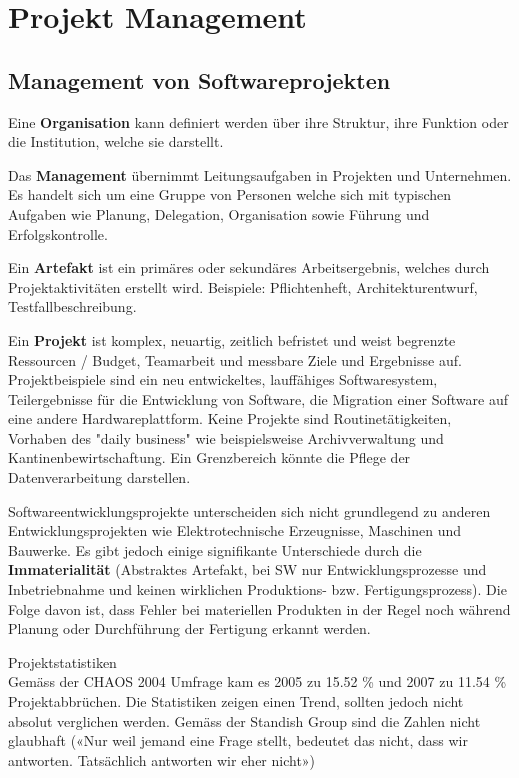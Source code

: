 \chapter{Projekt Management}

\section{Management von Softwareprojekten}

Eine \textbf{Organisation} kann definiert werden über ihre Struktur, ihre Funktion oder die Institution, welche sie darstellt.

Das \textbf{Management} übernimmt Leitungsaufgaben in Projekten und Unternehmen. Es handelt sich um eine Gruppe von Personen welche sich mit typischen Aufgaben wie Planung, Delegation, Organisation sowie Führung und Erfolgskontrolle. 

Ein \textbf{Artefakt} ist ein primäres oder sekundäres Arbeitsergebnis, welches durch Projektaktivitäten erstellt wird. Beispiele: Pflichtenheft, Architekturentwurf, Testfallbeschreibung. 

Ein \textbf{Projekt} ist komplex, neuartig, zeitlich befristet und weist begrenzte Ressourcen / Budget, Teamarbeit und messbare Ziele und Ergebnisse auf. Projektbeispiele sind ein neu entwickeltes, lauffähiges Softwaresystem, Teilergebnisse für die Entwicklung von Software, die Migration einer Software auf eine andere 
Hardwareplattform. 
Keine Projekte sind Routinetätigkeiten, Vorhaben des "daily business" wie beispielsweise Archivverwaltung und Kantinenbewirtschaftung. 
Ein Grenzbereich könnte die Pflege der Datenverarbeitung darstellen. 

Softwareentwicklungsprojekte unterscheiden sich nicht grundlegend zu anderen Entwicklungsprojekten wie Elektrotechnische Erzeugnisse, Maschinen und Bauwerke. Es gibt jedoch einige signifikante Unterschiede durch die \textbf{Immaterialität} (Abstraktes Artefakt, bei SW nur Entwicklungsprozesse und 
Inbetriebnahme und keinen wirklichen Produktions- bzw. Fertigungsprozess). Die Folge davon ist, dass Fehler bei materiellen Produkten in der Regel noch während Planung oder Durchführung der Fertigung erkannt werden. 

Projektstatistiken \\
Gemäss der CHAOS 2004 Umfrage kam es 2005 zu 15.52 \% und 2007 zu 11.54 \% Projektabbrüchen. Die Statistiken zeigen einen Trend, sollten jedoch nicht absolut verglichen werden. Gemäss der Standish Group sind die Zahlen nicht glaubhaft («Nur weil jemand eine Frage stellt, bedeutet das nicht, 
dass wir antworten. Tatsächlich antworten wir 
eher nicht»)

